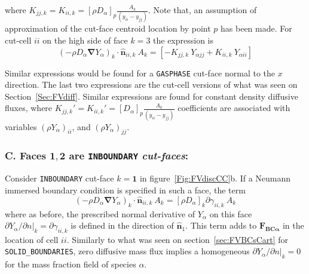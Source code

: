 \documentclass[12pt]{article}
\begin{document}
%
where $K_{jj,k}=K_{ii,k}=[ \rho D_\alpha ]_p \frac{A_k}{(y_{ii}-y_{jj})}$. Note that, an assumption of approximation of the cut-face centroid location by point $p$ has been made. For cut-cell $ii$ on the high side of face $k=3$ the expression is
%
\begin{equation}
  \left( - \rho D_\alpha \boldsymbol{\nabla} Y_\alpha \right)_k \cdot \hat{\mathbf{n}}_{ii,k} \: A_k = 
  \left[  -K_{jj,k} \: Y_{\alpha jj} +  K_{ii,k} \: Y_{\alpha ii} \right]
\end{equation} 
%

Similar expressions would be found for a \texttt{GASPHASE} cut-face normal to the $x$ direction. The last two expressions are the cut-cell versions of what was seen on Section~\ref{Sec:FVdiff}. Similar expressions are found for constant density diffusive fluxes, where $K_{jj,k}'=K_{ii,k}'=[D_\alpha ]_p \frac{A_k}{(y_{ii}-y_{jj})}$ coefficients are associated with variables $\left( \rho Y_{\alpha} \right)_{ii}$, and $\left( \rho Y_{\alpha} \right)_{jj}$.


\subsubsection*{C. Faces $\mathbf{1},\mathbf{2}$ are \texttt{INBOUNDARY} \textit{cut-faces}:}

Consider \texttt{INBOUNDARY} cut-face $k=\mathbf{1}$ in figure~\ref{Fig:FVdiscCC}b. If a Neumann immersed boundary condition is specified in such a face, the term 
%
\begin{equation}
  \left( - \rho D_\alpha \boldsymbol{\nabla} Y_\alpha \right)_k \cdot \hat{\mathbf{n}}_{ii,k} \: A_k = [\rho D_\alpha]_k \partial \gamma_{ii,k} \: A_k 
\end{equation} 
%
where as before, the prescribed normal derivative of $Y_\alpha$ on this face $\partial Y_\alpha / \partial n |_k=\partial  \gamma_{ii,k}$ is defined in the direction of $\hat{\mathbf{n}}_1$. 
This term adds to $\mathbf{F_{BC \alpha}}$ in the location of cell $ii$. Similarly to what was seen on section~\ref{sec:FVBCsCart} for \texttt{SOLID\_BOUNDARIES}, zero diffusive mass flux implies a homogeneous $\partial Y_\alpha / \partial n |_k=0$ for the mass fraction field of species $\alpha$.



\end{document}
